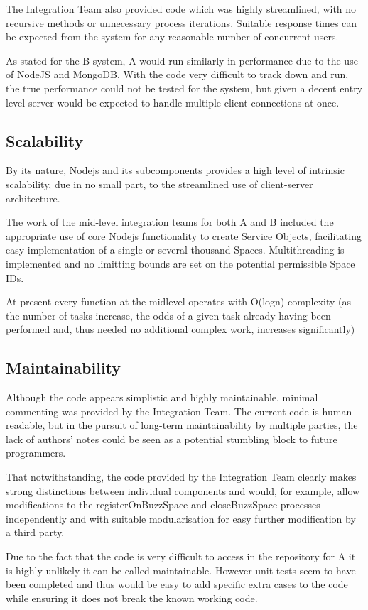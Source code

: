 \documentclass[12pt]{article}
\begin{document}
The Integration Team also provided code which was highly streamlined, with no recursive methods or unnecessary process iterations. Suitable response times can be expected from the system for any reasonable number of concurrent users.


As stated for the B system, A would run similarly in performance due to the use of NodeJS and MongoDB, With the code very difficult to track down and run, the true performance could not be tested for the system, but given a decent entry level server would be expected to handle multiple client connections at once.
\subsection{Scalability}
By its nature, Nodejs and its subcomponents provides a high level of intrinsic scalability, due in no small part, to the streamlined use of client-server architecture. 

The work of the mid-level integration teams for both A and B included the appropriate use of core Nodejs functionality to create Service Objects, facilitating easy implementation of a single or several thousand Spaces. Multithreading is implemented and no limitting bounds are set on the potential permissible Space IDs.

At present every function at the midlevel operates with O(logn) complexity (as the number of tasks increase, the odds of a given task already having been performed and, thus needed no additional complex work, increases significantly) 

\subsection{Maintainability}
Although the code appears simplistic and highly maintainable, minimal commenting was provided by the Integration Team. The current code is human-readable, but in the pursuit of long-term maintainability by multiple parties, the lack of authors’ notes could be seen as a potential stumbling block to future programmers.

That notwithstanding, the code provided by the Integration Team clearly makes strong distinctions between individual components and would, for example, allow modifications to the registerOnBuzzSpace and closeBuzzSpace processes independently and with suitable modularisation for easy further modification by a third party.

Due to the fact that the code is very difficult to access in the repository for A it is highly unlikely it can be called maintainable. However unit tests seem to have been completed and thus would be easy to add specific extra cases to the code while ensuring it does not break the known working code.
\end{document}
